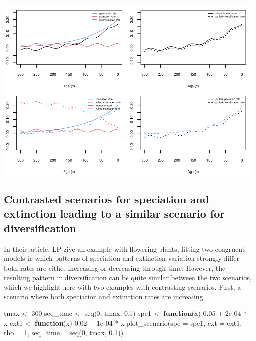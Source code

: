 \documentclass[
]{article}
\newenvironment{Shaded}{\begin{snugshade}}{\end{snugshade}}
\newcommand{\AttributeTok}[1]{\textcolor[rgb]{0.77,0.63,0.00}{#1}}
\newcommand{\ControlFlowTok}[1]{\textcolor[rgb]{0.13,0.29,0.53}{\textbf{#1}}}
\newcommand{\DecValTok}[1]{\textcolor[rgb]{0.00,0.00,0.81}{#1}}
\newcommand{\FloatTok}[1]{\textcolor[rgb]{0.00,0.00,0.81}{#1}}
\newcommand{\FunctionTok}[1]{\textcolor[rgb]{0.00,0.00,0.00}{#1}}
\newcommand{\NormalTok}[1]{#1}
\newcommand{\OtherTok}[1]{\textcolor[rgb]{0.56,0.35,0.01}{#1}}
\newcommand{\SpecialCharTok}[1]{\textcolor[rgb]{0.00,0.00,0.00}{#1}}
\begin{document}
\includegraphics{supplement_files/figure-latex/unnamed-chunk-11-1.pdf}

\pagebreak

\hypertarget{contrasted-scenarios-for-speciation-and-extinction-leading-to-a-similar-scenario-for-diversification}{%
\subsection{Contrasted scenarios for speciation and extinction leading
to a similar scenario for
diversification}\label{contrasted-scenarios-for-speciation-and-extinction-leading-to-a-similar-scenario-for-diversification}}

In their article, LP give an example with flowering plants, fitting two
congruent models in which patterns of speciation and extinction
variation strongly differ - both rates are either increasing or
decreasing through time. However, the resulting pattern in
diversification can be quite similar between the two scenarios, which we
highlight here with two examples with contrasting scenarios. First, a
scenario where both speciation and extinction rates are increasing.

\begin{Shaded}
\begin{Highlighting}[]
\NormalTok{tmax }\OtherTok{\textless{}{-}} \DecValTok{300}
\NormalTok{seq\_time }\OtherTok{\textless{}{-}} \FunctionTok{seq}\NormalTok{(}\DecValTok{0}\NormalTok{, tmax, }\FloatTok{0.1}\NormalTok{)}
\NormalTok{spe1 }\OtherTok{\textless{}{-}} \ControlFlowTok{function}\NormalTok{(x) }\FloatTok{0.05} \SpecialCharTok{+} \FloatTok{2e{-}04} \SpecialCharTok{*}\NormalTok{ x}
\NormalTok{ext1 }\OtherTok{\textless{}{-}} \ControlFlowTok{function}\NormalTok{(x) }\FloatTok{0.02} \SpecialCharTok{+} \FloatTok{1e{-}04} \SpecialCharTok{*}\NormalTok{ x}
\FunctionTok{plot\_scenario}\NormalTok{(}\AttributeTok{spe =}\NormalTok{ spe1, }\AttributeTok{ext =}\NormalTok{ ext1, }\AttributeTok{rho =} \DecValTok{1}\NormalTok{, }\AttributeTok{seq\_time =} \FunctionTok{seq}\NormalTok{(}\DecValTok{0}\NormalTok{,}
\NormalTok{    tmax, }\FloatTok{0.1}\NormalTok{))}
\end{Highlighting}
\end{Shaded}
\end{document}
